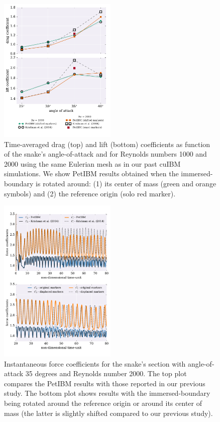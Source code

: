 \documentclass[9pt,twocolumn,twoside]{article}
\begin{document}
\begin{figure}[t]
\centering
\includegraphics[width=0.5\textwidth]{./figures/petibm011_forceCoefficientsVsAoA.pdf}
\caption{
Time-averaged drag (top) and lift (bottom) coefficients as function of the snake's angle-of-attack and for Reynolds numbers 1000 and 2000 using the same Eulerian mesh as in our past cuIBM simulations.
We show PetIBM results obtained when the immersed-boundary is rotated around: (1) its center of mass (green and orange symbols) and (2) the reference origin (solo red marker).}
\label{figure8}
\end{figure}


\begin{figure}[t]
\centering
\includegraphics[width=0.5\textwidth]{./figures/petibm011_forceCoefficientsRe2000AoA35.pdf}
\caption{
Instantaneous force coefficients for the snake's section with angle-of-attack 35 degrees and Reynolds number 2000.
The top plot compares the PetIBM results with those reported in our previous study.
The bottom plot shows results with the immersed-boundary being rotated around the reference origin or  around its center of mass (the latter is slightly shifted compared to our previous study).}
\label{figure9}
\end{figure}
\end{document}
